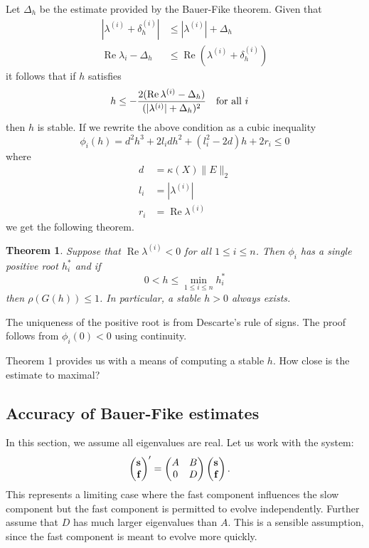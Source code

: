 \documentclass[10pt]{article}
\renewcommand{\Re}{\mathop{\textrm{Re}}}
\begin{document}
Let $\Delta_h$ be the estimate provided by the Bauer-Fike theorem. Given
that
%
\begin{align*}
|\lambda^{(i)} + \delta_h^{(i)}| &\leq |\lambda^{(i)}| + \Delta_h \\
\Re \lambda_i - \Delta_h &\leq \Re(\lambda^{(i)} + \delta_h^{(i)})
\end{align*}
%
it follows that if $h$ satisfies
%
\begin{align*}
h \leq -\frac{2(\Re \lambda^{(i)} - \Delta_h)}{(|\lambda^{(i)}| + \Delta_h)^2}
& \textrm{\quad for all } i
\end{align*}
%
then $h$ is stable. If we rewrite the above condition as a cubic
inequality
%
\[ \phi_i(h) = d^2 h^3 + 2l_idh^2 + (l_i^2 - 2d)h + 2r_i \leq 0 \]
%
%
where
%
\begin{align*}
d &= \kappa(X) \|E\|_2 \\
l_i &= |\lambda^{(i)}| \\
r_i &= \Re \lambda^{(i)}
\end{align*}
%
we get the following theorem.
%
\newtheorem{thm}{Theorem}
\begin{thm}
Suppose that $\Re \lambda^{(i)} < 0$ for all $1 \leq i \leq n$. Then
$\phi_i$ has a single positive root $h_i^*$ and if
%
\[ 0 < h \leq \min_{1 \leq i \leq n} h_i^* \]
%
then $\rho(G(h)) \leq 1$. In particular, a stable $h > 0$ always exists.
\end{thm}

The uniqueness of the positive root is from Descarte's rule of
signs. The proof follows from $\phi_i(0) < 0$ using continuity.

Theorem 1 provides us with a means of computing a stable $h$. How close
is the estimate to maximal?

\subsection*{Accuracy of Bauer-Fike estimates}

In this section, we assume all eigenvalues are real. Let us work with
the system:
%
\begin{align*}
 \begin{pmatrix} \mathbf{s}_{} \\ \mathbf{f}_{} \end{pmatrix}' &= \begin{pmatrix} A & B \\ 0 & D \end{pmatrix} \begin{pmatrix} \mathbf{s}_{} \\ \mathbf{f}_{} \end{pmatrix}.
\end{align*}
%
This represents a limiting case where the fast component influences the
slow component but the fast component is permitted to evolve
independently. Further assume that $D$ has much larger eigenvalues than
$A$. This is a sensible assumption, since the fast component is meant to
evolve more quickly.
\end{document}
